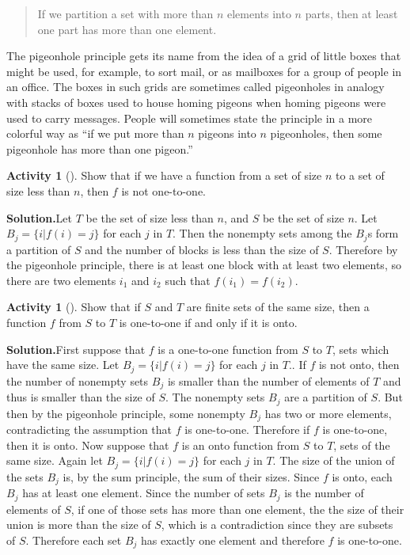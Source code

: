 \documentclass[10pt,]{book}
\theoremstyle{plain}
\theoremstyle{definition}
\newtheorem{activity}[project]{Activity}
\numberwithin{equation}{chapter}
\begin{document}
\begin{quote}If we partition a set with more than \(n\) elements into \(n\) parts, then at least one part has more than one element.%
\end{quote}
The pigeonhole principle gets its name from the idea of a grid of little boxes that might be used, for example, to sort mail, or as mailboxes for a group of people in an office. The boxes in such grids are sometimes called pigeonholes in analogy with stacks of boxes used to house homing pigeons when homing pigeons were used to carry messages. People will sometimes state the principle in a more colorful way as ``if we put more than \(n\) pigeons into \(n\) pigeonholes, then some pigeonhole has more than one pigeon.''%
\begin{activity}[]\label{activity-61}
Show that if we have a function from a set of size \(n\) to a set of size less than \(n\), then \(f\) is not one-to-one.%
\par\medskip\noindent%
\textbf{Solution.}\quad Let \(T\) be the set of size less than \(n\), and \(S\) be the set of size \(n\). Let \(B_j=\{i|f(i)=j\}\) for each \(j\) in \(T\). Then the nonempty sets among the \(B_j\)s form a partition of \(S\) and the number of blocks is less than the size of \(S\). Therefore by the pigeonhole principle, there is at least one block with at least two elements, so there are two elements \(i_1\) and \(i_2\) such that \(f(i_1)=f(i_2)\).%
\end{activity}
\begin{activity}[]\label{activity-62}
Show that if \(S\) and \(T\) are finite sets of the same size, then a function \(f\) from \(S\) to \(T\) is one-to-one if and only if it is onto.%
\par\medskip\noindent%
\textbf{Solution.}\quad First suppose that \(f\) is a one-to-one function from \(S\) to \(T\), sets which have the same size. Let \(B_j=\{i|f(i)=j\}\) for each \(j\) in \(T\)..  If \(f\) is not onto, then the number of nonempty sets \(B_j\) is smaller than the number of elements of \(T\) and thus is smaller than the size of \(S\). The nonempty sets \(B_j\) are a partition of \(S\). But then by the pigeonhole principle, some nonempty \(B_j\) has two or more elements, contradicting the assumption that \(f\) is one-to-one. Therefore if \(f\) is one-to-one, then it is onto. Now suppose that \(f\) is an onto function from \(S\) to \(T\), sets of the same size. Again let \(B_j =\{i|f(i)=j\}\) for each \(j\) in \(T\). The size of the union of the sets \(B_j\) is, by the sum principle, the sum of their sizes. Since \(f\) is onto, each \(B_j\) has at least one element. Since the number of sets \(B_j\) is the number of elements of \(S\), if one of those sets has more than one element, the the size of their union is more than the size of \(S\), which is a contradiction since they are subsets of \(S\). Therefore each set \(B_j\) has exactly one element and therefore \(f\) is one-to-one.%
\end{activity}
\end{document}
